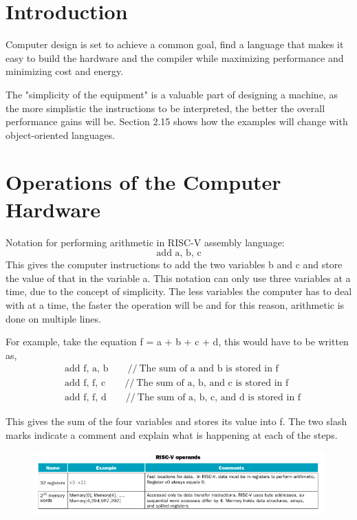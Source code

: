 \documentclass[12pt]{article}
\begin{document}
    \section*{Introduction}
    \par Computer design is set to achieve a common goal, find a language that
    makes it easy to build the hardware and the compiler while maximizing
    performance and minimizing cost and energy.
    \par The "simplicity of the equipment" is a valuable part of designing a
    machine, as the more simplistic the instructions to be interpreted, the
    better the overall performance gains will be. Section 2.15 shows how the
    examples will change with object-oriented languages.
    \section*{Operations of the Computer Hardware}
    \par Notation for performing arithmetic in RISC-V assembly language:
    \[
        \text{add a, b, c}
    \]
    This gives the computer instructions to add the two variables b and c
    and store the value of that in the variable a. This notation can only use
    three variables at a time, due to the concept of simplicity. The less
    variables the computer has to deal with at a time, the faster the operation
    will be and for this reason, arithmetic is done on multiple lines.
    \par For example, take the equation f = a + b + c + d, this would have to
    be written as,
    \begin{align*}
        &\text{add f, a, b}\qquad //\ \text{The sum of a and b is stored in f} \\
        &\text{add f, f, c}\qquad //\ \text{The sum of a, b, and c is stored in f} \\
        &\text{add f, f, d}\qquad //\ \text{The sum of a, b, c, and d is stored in f}
    \end{align*}
    \par This gives the sum of the four variables and stores its value into f. The
    two slash marks indicate a comment and explain what is happening at each of
    the steps.
    \begin{figure}[h]
        \centering
        \includegraphics[width=1\textwidth]{RISC-V operands.png}
    \end{figure}
\end{document}
